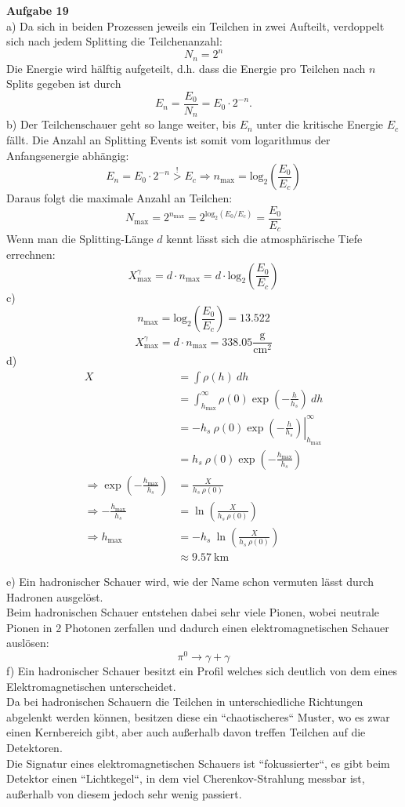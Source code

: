 \documentclass[11pt, a4paper]{article}
\begin{document}
\thispagestyle{fancy}
\noindent
{\large\textbf{Aufgabe 19}} \\[0.2cm]
a) Da sich in beiden Prozessen jeweils ein Teilchen in zwei Aufteilt, verdoppelt sich nach jedem Splitting
die Teilchenanzahl:
\[ N_n = 2^n \]
Die Energie wird hälftig aufgeteilt, d.h. dass die Energie pro Teilchen nach $n$ Splits gegeben ist durch
\[ E_n = \frac{E_0}{N_n} = E_0 \cdot 2^{-n}. \]
b) Der Teilchenschauer geht so lange weiter, bis $E_n$ unter die kritische Energie $E_c$ fällt. Die Anzahl an
Splitting Events ist somit vom logarithmus der Anfangsenergie abhängig:
\[ 
	E_n = E_0 \cdot 2^{-n} \overset !> E_c 
	\Rightarrow
	n_\text{max} = \text{log}_2 \left( \frac{E_0}{E_c} \right)
\]
Daraus folgt die maximale Anzahl an Teilchen:
\[
	N_\text{max} = 2^{n_\text{max}} = 2^{\text{log}_2 (E_0 / E_c )} = \frac{E_0}{E_c} 
\]
Wenn man die Splitting-Länge $d$ kennt lässt sich die atmosphärische Tiefe errechnen:
\[ X_\text{max}^\gamma = d \cdot n_\text{max} = d \cdot \text{log}_2 \left( \frac{E_0}{E_c} \right) \]
c) 
\[ n_\text{max} = \text{log}_2 \left( \frac{E_0}{E_c} \right) = 13.522 \]
\[ X_\text{max}^\gamma = d \cdot n_\text{max} = 338.05 \frac{\text{g}}{\text{cm}^2} \]
d)
\begin{align*}
	X
	&= \int \rho(h) \ dh \\
	&= \int_{h_\text{max}}^\infty \rho(0) \exp \left(-\frac{h}{h_s} \right) \ dh \\
	&= \left. -h_s \ \rho(0) \exp \left(-\frac{h}{h_s} \right) \right|_{h_\text{max}}^\infty \\
	&= h_s \ \rho(0) \exp \left(-\frac{h_\text{max}}{h_s} \right) \\
	\Rightarrow
	\exp \left(-\frac{h_\text{max}}{h_s} \right)
	&= \frac{X}{h_s \ \rho(0)} \\
	\Rightarrow
	-\frac{h_\text{max}}{h_s}
	&= \ln \left( \frac{X}{h_s \ \rho(0)} \right) \\
	\Rightarrow
	h_\text{max}
	&= -h_s \ \ln \left( \frac{X}{h_s \ \rho(0)} \right) \\
	&\approx 9.57 \ \text{km}
\end{align*}

\newpage
\setlength{\headheight}{0cm}

e) Ein hadronischer Schauer wird, wie der Name schon vermuten lässt durch Hadronen ausgelöst. \\
Beim hadronischen Schauer entstehen dabei sehr viele Pionen, wobei neutrale Pionen in 2 Photonen zerfallen
und dadurch einen elektromagnetischen Schauer auslösen:
\[ \pi^0 \rightarrow \gamma + \gamma \]
f) Ein hadronischer Schauer besitzt ein Profil welches sich deutlich von dem eines Elektromagnetischen 
unterscheidet. \\
Da bei hadronischen Schauern die Teilchen in unterschiedliche Richtungen abgelenkt werden können, besitzen
diese ein ``chaotischeres`` Muster, wo es zwar einen Kernbereich gibt, aber auch außerhalb davon treffen
Teilchen auf die Detektoren.\\
Die Signatur eines elektromagnetischen Schauers ist ``fokussierter``, es gibt beim Detektor einen ``Lichtkegel``,
in dem viel Cherenkov-Strahlung messbar ist, außerhalb von diesem jedoch sehr wenig passiert.
\end{document}
